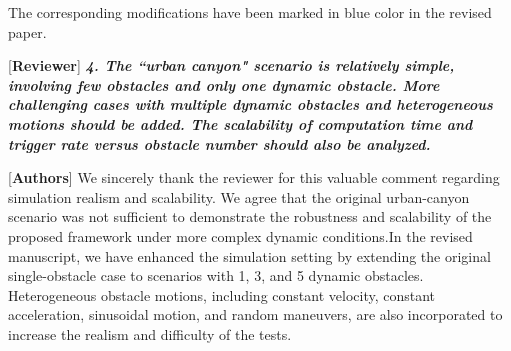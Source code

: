 \documentclass[12pt, twosides]{article}
\theoremstyle{definition}
\begin{document}
\begin{table}[t]
	\captionsetup{labelformat=empty}
	\caption{\textcolor{blue}{Table III: Quantitative Performance Comparison of Different Algorithms in a Complex Dynamic Urban Scenario}}
	\label{tab:baseline_comparison}
	\centering
	\renewcommand{\arraystretch}{1.15}
	\setlength{\tabcolsep}{2pt}
	\footnotesize
\end{table}

	
The corresponding modifications have been marked in blue color in the revised paper.
\medskip

\textcolor[rgb]{0.00,0.00,1.00}{[\textbf {Reviewer}]} \textit{\textbf{4. The ``urban canyon" scenario is relatively simple, involving few obstacles and only one dynamic obstacle. More challenging cases with multiple dynamic obstacles and heterogeneous motions should be added. The scalability of computation time and trigger rate versus obstacle number should also be analyzed.}}

\textcolor[rgb]{0.00,0.00,1.00}{[\textbf{Authors}]} 
We sincerely thank the reviewer for this valuable comment regarding simulation realism and scalability. We agree that the original urban-canyon scenario was not sufficient to demonstrate the robustness and scalability of the proposed framework under more complex dynamic conditions.In the revised manuscript, we have enhanced the simulation setting by extending the original single-obstacle case to scenarios with 1, 3, and 5 dynamic obstacles. Heterogeneous obstacle motions, including constant velocity, constant acceleration, sinusoidal motion, and random maneuvers, are also incorporated to increase the realism and difficulty of the tests.
\end{document}
